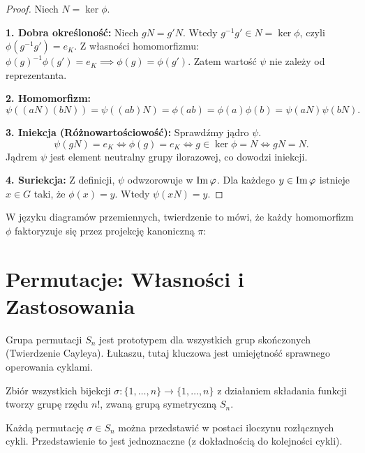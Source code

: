\begin{proof}
Niech $N = \ker \phi$.

\noindent \textbf{1. Dobra określoność:}
Niech $gN = g'N$. Wtedy $g^{-1}g' \in N = \ker \phi$, czyli $\phi(g^{-1}g') = e_K$.
Z własności homomorfizmu: $\phi(g)^{-1}\phi(g') = e_K \implies \phi(g) = \phi(g')$.
Zatem wartość $\psi$ nie zależy od reprezentanta.

\noindent \textbf{2. Homomorfizm:}
\[ \psi((aN)(bN)) = \psi((ab)N) = \phi(ab) = \phi(a)\phi(b) = \psi(aN)\psi(bN). \]

\noindent \textbf{3. Iniekcja (Różnowartościowość):}
Sprawdźmy jądro $\psi$.
\[ \psi(gN) = e_K \iff \phi(g) = e_K \iff g \in \ker \phi = N \iff gN = N. \]
Jądrem $\psi$ jest element neutralny grupy ilorazowej, co dowodzi iniekcji.

\noindent \textbf{4. Suriekcja:}
Z definicji, $\psi$ odwzorowuje w $\operatorname{Im} \varphi$. Dla każdego $y \in \operatorname{Im} \varphi$ istnieje $x \in G$ taki, że $\phi(x)=y$. Wtedy $\psi(xN) = y$.
\end{proof}

W języku diagramów przemiennych, twierdzenie to mówi, że każdy homomorfizm $\phi$ faktoryzuje się przez projekcję kanoniczną $\pi$:

\begin{center}
\end{center}

\section{Permutacje: Własności i Zastosowania}

Grupa permutacji $S_n$ jest prototypem dla wszystkich grup skończonych (Twierdzenie Cayleya). Łukaszu, tutaj kluczowa jest umiejętność sprawnego operowania cyklami.

\begin{definition}
Zbiór wszystkich bijekcji $\sigma: \{1, \dots, n\} \to \{1, \dots, n\}$ z działaniem składania funkcji tworzy grupę rzędu $n!$, zwaną grupą symetryczną $S_n$.
\end{definition}

\begin{theorem}
Każdą permutację $\sigma \in S_n$ można przedstawić w postaci iloczynu rozłącznych cykli. Przedstawienie to jest jednoznaczne (z dokładnością do kolejności cykli).
\end{theorem}

